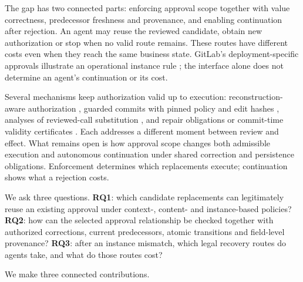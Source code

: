 \documentclass[pdflatex,sn-basic]{sn-jnl}
\begin{document}
The gap has two connected parts: enforcing approval scope together with value correctness, predecessor freshness and provenance, and enabling continuation after rejection. An agent may reuse the reviewed candidate, obtain new authorization or stop when no valid route remains. These routes have different costs even when they reach the same business state. GitLab's deployment-specific approvals illustrate an operational instance rule \citep{gitlab-deployment-approval}; the interface alone does not determine an agent's continuation or its cost.

Several mechanisms keep authorization valid up to execution: reconstruction-aware authorization \citep{zhu2026resa}, guarded commits with pinned policy and edit hashes \citep{bindschaedler2026guarded}, analyses of reviewed-call substitution \citep{kumar2026loopjacking,wang2026approval}, and repair obligations or commit-time validity certificates \citep{wang2026acg,qi2026revise}. Each addresses a different moment between review and effect. What remains open is how approval scope changes both admissible execution and autonomous continuation under shared correction and persistence obligations. Enforcement determines which replacements execute; continuation shows what a rejection costs.

We ask three questions. \textbf{RQ1}: which candidate replacements can legitimately reuse an existing approval under context-, content- and instance-based policies? \textbf{RQ2}: how can the selected approval relationship be checked together with authorized corrections, current predecessors, atomic transitions and field-level provenance? \textbf{RQ3}: after an instance mismatch, which legal recovery routes do agents take, and what do those routes cost?

We make three connected contributions.
\end{document}
